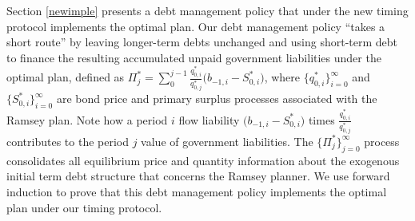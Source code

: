 \documentclass[12pt]{article}
\newcommand{\WJ}[1]{{\textcolor{red}{#1}}}
\begin{document}

Section \ref{newimple} presents a  debt management policy that under the new timing protocol implements the optimal  plan.  Our debt management policy  ``takes a short route'' by leaving longer-term debts unchanged and using short-term debt to finance  the resulting accumulated unpaid government liabilities under the optimal plan, defined as 
{%
$\Pi_j^\ast= \sum_0^{j-1} \frac{q_{0,i}^\ast}{q_{0,j}^\ast} \big(b_{-1,i}- S_{0,i}^\ast\big) $, where $\{q_{0,i}^\ast\}_{i= 0}^\infty$ and $\{S_{0,i}^\ast\}_{i= 0}^\infty$ are  bond price and  primary surplus processes associated with the Ramsey plan. Note how a  period $i$ flow liability $\big(b_{-1,i}- S_{0,i}^\ast\big) $ times     $\frac{q_{0,i}^\ast}{q_{0,j}^\ast} $  contributes to  the period $j$ value of government liabilities. 
The  $\{\Pi_j^\ast\}_{j= 0}^\infty$ process consolidates  all    equilibrium price and   quantity   information about the  exogenous initial term debt structure  that concerns the Ramsey planner. 
} %
We use  forward induction to prove that this debt management  policy implements the optimal plan under our  timing protocol.

\end{document}
